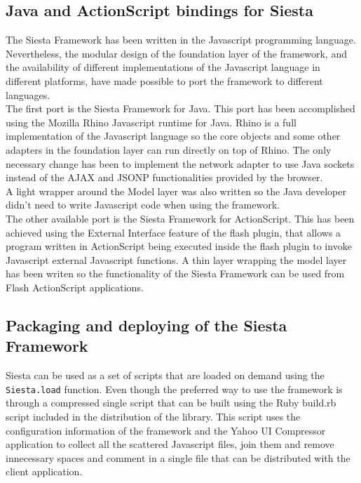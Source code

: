 \subsection{Java and ActionScript bindings for Siesta}
The Siesta Framework has been written in the Javascript programming language. Nevertheless, the modular design of the
foundation layer of the framework, and the availability of different implementations of the Javascript language in
different platforms, have made possible to port the framework to different languages.\\
The first port is the Siesta Framework for Java. This port has been accomplished using the Mozilla Rhino Javascript
runtime for Java. Rhino is a full implementation of the Javascript language so the core objects and some other
adapters in the foundation layer can run directly on top  of Rhino. The only necessary change has been to implement the
network adapter to use Java sockets instead of the AJAX and JSONP functionalities provided by the browser.\\
A light wrapper around the Model layer was also written so the Java developer didn't need to write Javascript code when
using the framework.\\

The other available port is the Siesta Framework for ActionScript. This has been achieved using the External Interface feature of the flash plugin, that allows a program written in ActionScript being executed inside the flash plugin to
invoke Javascript external Javascript functions. A thin layer wrapping the model layer has been writen so the
functionality of the Siesta Framework can be used from Flash ActionScript applications.

\subsection{Packaging and deploying of the Siesta Framework}

Siesta can be used as a set of scripts that are loaded on demand using the \texttt{Siesta.load} function. Even though
the preferred way to use the framework is through a compressed single script that can be built using the Ruby build.rb
script included in the distribution of the library. This script uses the configuration information of the framework and
the Yahoo UI Compressor application to collect all the scattered Javascript files, join them and remove innecessary
spaces and comment in a single file that can be distributed with the client application.

